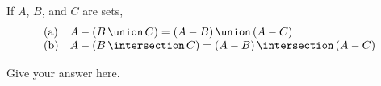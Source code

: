 \documentclass[10pt]{article}
\begin{document}
\begin{stmtsoln}{27}
	If $A$, $B$, and $C$ are sets,
\[\begin{array}{ll} 
\textrm{(a)} &  A - (\setunion{B}{C}) = \setunion{(A-B)}{(A-C)}
\\
\textrm{(b)} & A - (\setintersection{B}{C}) = \setintersection{(A-B)}{(A-C)}
\end{array}\]

	\answer
	Give your answer here.
\end{stmtsoln}




%	
\end{document}

